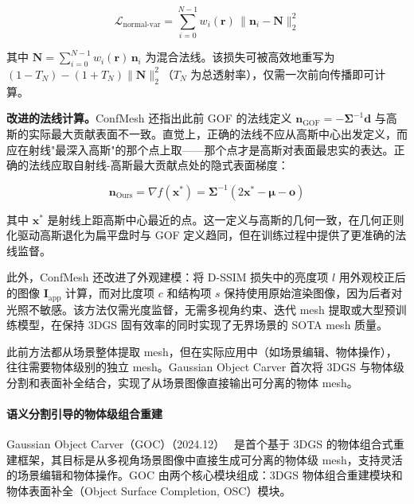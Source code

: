 \begin{equation}
\mathcal{L}_{\text{normal-var}} = \sum_{i=0}^{N-1} w_i(\bm{r})\, \|\bm{n}_i - \bm{N}\|_2^2
\end{equation}

其中 $\bm{N} = \sum_{i=0}^{N-1} w_i(\bm{r})\, \bm{n}_i$ 为混合法线。该损失可被高效地重写为 $(1-T_N) - (1+T_N)\|\bm{N}\|_2^2$（$T_N$ 为总透射率），仅需一次前向传播即可计算。

\textbf{改进的法线计算。}ConfMesh 还指出此前 GOF 的法线定义 $\bm{n}_{\text{GOF}} = -\bm{\Sigma}^{-1}\bm{d}$ 与高斯的实际最大贡献表面不一致。直觉上，正确的法线不应从高斯中心出发定义，而应在射线"最深入高斯"的那个点上取——那个点才是高斯对表面最忠实的表达。正确的法线应取自射线-高斯最大贡献点处的隐式表面梯度：

\begin{equation}
\bm{n}_{\text{Ours}} = \nabla f(\bm{x}^*) = \bm{\Sigma}^{-1}(2\bm{x}^* - \bm{\mu} - \bm{o})
\end{equation}

其中 $\bm{x}^*$ 是射线上距高斯中心最近的点。这一定义与高斯的几何一致，在几何正则化驱动高斯退化为扁平盘时与 GOF 定义趋同，但在训练过程中提供了更准确的法线监督。

此外，ConfMesh 还改进了外观建模：将 D-SSIM 损失中的亮度项 $l$ 用外观校正后的图像 $\bm{I}_{\text{app}}$ 计算，而对比度项 $c$ 和结构项 $s$ 保持使用原始渲染图像，因为后者对光照不敏感。该方法仅需光度监督，无需多视角约束、迭代 mesh 提取或大型预训练模型，在保持 3DGS 固有效率的同时实现了无界场景的 SOTA mesh 质量。

此前方法都从场景整体提取 mesh，但在实际应用中（如场景编辑、物体操作），往往需要物体级别的独立 mesh。Gaussian Object Carver 首次将 3DGS 与物体级分割和表面补全结合，实现了从场景图像直接输出可分离的物体 mesh。

\paragraph{语义分割引导的物体级组合重建}

Gaussian Object Carver（GOC）（2024.12）~\cite{2412_02075} 是首个基于 3DGS 的物体组合式重建框架，其目标是从多视角场景图像中直接生成可分离的物体级 mesh，支持灵活的场景编辑和物体操作。GOC 由两个核心模块组成：3DGS 物体组合重建模块和物体表面补全（Object Surface Completion, OSC）模块。

